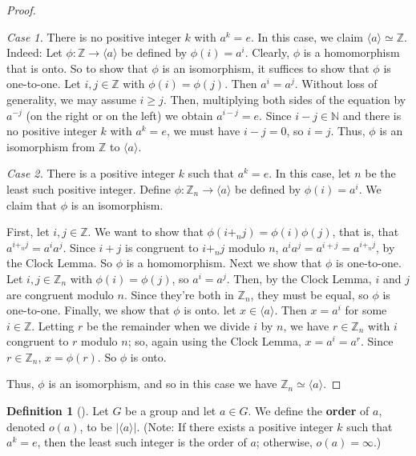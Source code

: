 \documentclass[10pt,]{book}
\newcommand{\terminology}[1]{\textbf{#1}}
\theoremstyle{plain}
\theoremstyle{definition}
\newtheorem{definition}[theorem]{Definition}
\theoremstyle{definition}
\theoremstyle{definition}
\theoremstyle{definition}
\numberwithin{equation}{section}
\def\Z{\mathbb{Z}}
\def\N{\mathbb{N}}
\begin{document}
\begin{proof}\hypertarget{proof-23}{}
\emph{Case 1.} There is no positive integer \(k\) with \(a^k=e\). In this case, we claim \(\langle a\rangle \simeq \Z\). Indeed: Let \(\phi:\Z\to \langle a\rangle\) be defined by \(\phi(i)=a^i\). Clearly, \(\phi\) is a homomorphism that is onto. So to show that \(\phi\) is an isomorphism, it suffices to show that \(\phi\) is one-to-one. Let \(i,j\in \Z\) with \(\phi(i)=\phi(j)\). Then \(a^i=a^j\). Without loss of generality, we may assume \(i\geq j\). Then, multiplying both sides of the equation by \(a^{-j}\) (on the right or on the left) we obtain \(a^{i-j}=e\). Since \(i-j\in \N\) and there is no positive integer \(k\) with \(a^k=e\), we must have \(i-j=0\), so \(i=j\). Thus, \(\phi\) is an isomorphism from \(\Z\) to \(\langle a\rangle\).%
\par
\emph{Case 2.}  There is a positive integer \(k\) such that \(a^k=e\). In this case, let \(n\) be the least such positive integer. Define \(\phi:\Z_n\to \langle a\rangle\) be defined by \(\phi(i)=a^i\). We claim that \(\phi\) is an isomorphism.%
\par
First, let \(i,j\in \Z\). We want to show that \(\phi(i+_nj)=\phi(i)\phi(j)\), that is, that \(a^{i+_nj}=a^ia^j\). Since \(i+j\) is congruent to \(i+_nj\) modulo \(n\), \(a^ia^j=a^{i+j}=a^{i+_nj}\), by the Clock Lemma. So \(\phi\) is a homomorphism. Next we show that \(\phi\) is one-to-one. Let \(i,j\in \Z_n\) with \(\phi(i)=\phi(j)\), so \(a^i=a^j\). Then, by the Clock Lemma, \(i\) and \(j\) are congruent modulo \(n\). Since they're both in \(\Z_n\), they must be equal, so \(\phi\) is one-to-one. Finally, we show that \(\phi\) is onto. let \(x\in \langle a\rangle\). Then \(x=a^i\) for some \(i\in \Z\). Letting \(r\) be the remainder when we divide \(i\) by \(n\), we have \(r\in \Z_n\) with \(i\) congruent to \(r\) modulo \(n\); so, again using the Clock Lemma, \(x=a^i=a^r\). Since \(r\in \Z_n\), \(x=\phi(r)\). So \(\phi\) is onto.%
\par
Thus, \(\phi\) is an isomorphism, and so in this case we have \(\Z_n \simeq \langle a \rangle\).%
\end{proof}
\begin{definition}[{}]\label{definition-39}
Let \(G\) be a group and let \(a\in G\). We define the \terminology{order} of \(a\), denoted \(o(a)\), to be \(|\langle a\rangle |\). (Note: If there exists a positive integer \(k\) such that \(a^k=e\), then the least such integer is the order of \(a\); otherwise, \(o(a)=\infty\).)%
\end{definition}
\end{document}
